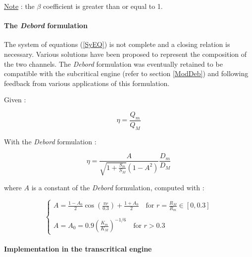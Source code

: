 \vspace{0.5cm}

\underline{Note} :  the $\beta$ coefficient is greater than or equal to 1.

\paragraph{The \emph{Debord} formulation\\}

\hspace*{1cm}

The system of equations (\ref{SyEQ}) is not complete and a closing relation is necessary. Various solutions have been proposed to represent the composition of the two channels. The \emph{Debord} formulation was eventually retained to be compatible with the subcritical engine (refer to section \ref{ModDeb}) and following feedback from various applications of this formulation.

\vspace{0.5cm}

Given :

\begin{equation}
 \eta = \frac{Q_m}{Q_M}
\end{equation}

\vspace{0.5cm}

With the \emph{Debord} formulation :

\begin{equation}
 \eta = \frac{A}{\displaystyle \sqrt{1+\frac{S_m}{S_M}}(1-A^2)} \frac{D_m}{D_M}
\end{equation}

\vspace{0.5cm}

where $A$ is a constant of the \emph{Debord} formulation, computed with :

\begin{equation}
 \left \lbrace
  \begin{array}{l}
    A = \frac{1-A_0}{2}\cos \left ( \frac{\pi r}{0.3} \right ) + \frac{1+A_0}{2} \quad \mbox{for } r=\frac{R_M}{R_m} \in [0,0.3] \\
    \\
    A = A_0 = 0.9 \left ( \frac{K_m}{K_M} \right )^{-1/6} \quad \mbox{for } r > 0.3
  \end{array}
 \right.
\end{equation}

\paragraph{Implementation in the transcritical engine\\}

